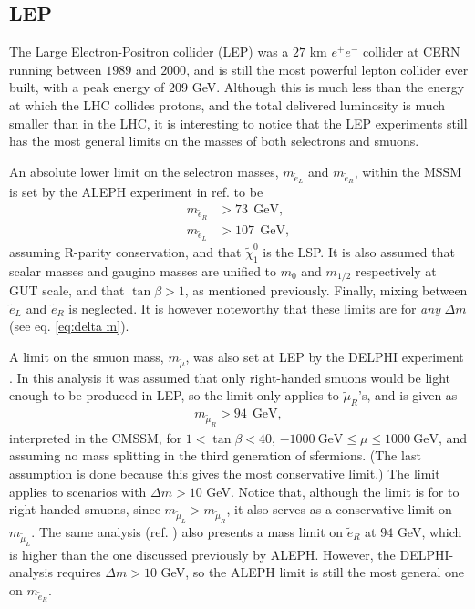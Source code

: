 \documentclass[twocolumn,a4paper,10pt]{article}
\begin{document}
\subsection{LEP}

The Large Electron-Positron collider (LEP) was a $27$ km $e^+e^-$ collider at CERN running between 
$1989$ and $2000$, and is still the most powerful lepton collider ever built, with a peak energy of 
$209$ GeV. Although this is much less than the energy at which the LHC collides protons, and the 
total delivered luminosity is much smaller than in the LHC, it is interesting to notice that the 
LEP experiments still has the most general limits on the masses of both selectrons and smuons.  

An absolute lower limit on the selectron masses, $m_{\tilde{e}_L}$ and $m_{\tilde{e}_R}$,  within the 
MSSM is set by the ALEPH experiment in ref. \cite{ALEPH:2002} to be  
\begin{align*}
m_{\tilde{e}_R} & > 73 \:\: \text{GeV}, \\
m_{\tilde{e}_L} & > 107 \:\: \text{GeV},   
\end{align*}       
assuming R-parity conservation, and that $\tilde{\chi}_1^0$ is the LSP. It is also assumed that 
scalar masses and gaugino masses are unified to $m_0$ and $m_{1/2}$ respectively at GUT scale, and 
that $\tan\beta > 1$, as mentioned previously. Finally, mixing between $\tilde{e}_L$ and $\tilde{e}_R$ 
is neglected. It is however noteworthy that these limits are for \textit{any} $\Delta m$ (see eq. 
\ref{eq:delta m}). 

A limit on the smuon mass, $m_{\tilde{\mu}}$, was also set at LEP by the DELPHI experiment 
\cite{DELPHI:2003}. In this analysis it was assumed that only right-handed smuons would be light enough 
to be produced in LEP, so the limit only applies to $\tilde{\mu}_R$'s, and is given as 
\begin{align*}
m_{\tilde{\mu}_R} > 94 \:\: \text{GeV}, 
\end{align*}
interpreted in the CMSSM, for $1<\tan\beta <40$, $-1000\:\text{GeV} \leq \mu \leq 1000 \: \text{GeV}$, 
and assuming no mass splitting in the third generation of sfermions. (The last assumption is done because 
this gives the most conservative limit.) The limit applies to scenarios with  
$\Delta m > 10$ GeV.  Notice that, although the limit is for to right-handed smuons, since 
$m_{\tilde{\mu}_L}>m_{\tilde{\mu}_R}$, it also serves as a conservative limit on $m_{\tilde{\mu}_L}$. 
The same analysis (ref. \cite{DELPHI:2003}) also presents a mass limit on $\tilde{e}_R$ at $94$ GeV, 
which is higher than the one discussed previously by ALEPH. However, the DELPHI-analysis requires 
$\Delta m > 10$ GeV, so the ALEPH limit is still the most general one on $m_{\tilde{e}_R}$.   
\end{document}

